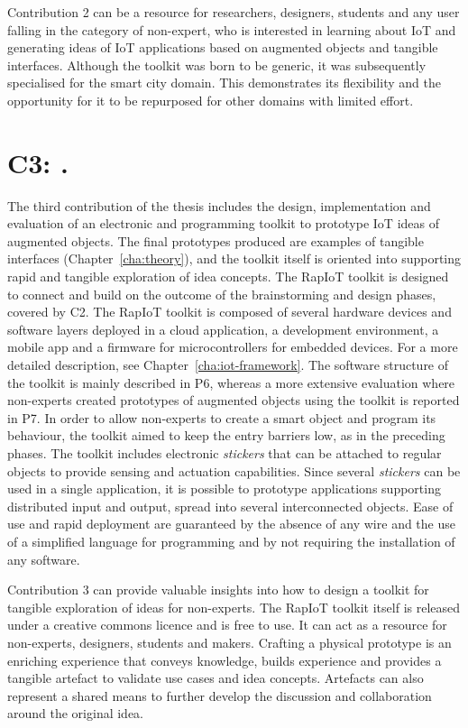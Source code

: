 Contribution 2 can be a resource for researchers, designers, students and any user falling in the category of non-expert, who is interested in learning about IoT and generating ideas of IoT applications based on augmented objects and tangible interfaces. Although the toolkit was born to be generic, it was subsequently specialised for the smart city domain. This demonstrates its flexibility and the opportunity for it to be repurposed for other domains with limited effort.


\section[C3: \Ciii][Contribution 3]{C3: \Ciii.}
\label{c3}

The third contribution of the thesis includes the design, implementation and evaluation of an electronic and programming toolkit to prototype IoT ideas of augmented objects. The final prototypes produced are examples of tangible interfaces (Chapter~\ref{cha:theory}), and the toolkit itself is oriented into supporting rapid and tangible exploration of idea concepts. The RapIoT toolkit is designed to connect and build on the outcome of the brainstorming and design phases, covered by C2.
The RapIoT toolkit is composed of several hardware devices and software layers deployed in a cloud application, a development environment, a mobile app and a firmware for microcontrollers for embedded devices. For a more detailed description, see Chapter~\ref{cha:iot-framework}. The software structure of the toolkit is mainly described in P6, whereas a more extensive evaluation where non-experts created prototypes of augmented objects using the toolkit is reported in P7.
In order to allow non-experts to create a smart object and program its behaviour, the toolkit aimed to keep the entry barriers low, as in the preceding phases.
The toolkit includes electronic \textit{stickers} that can be attached to regular objects to provide sensing and actuation capabilities. Since several \textit{stickers} can be used in a single application, it is possible to prototype applications supporting distributed input and output, spread into several interconnected objects.
Ease of use and rapid deployment are guaranteed by the absence of any wire and the use of a simplified language for programming and by not requiring the installation of any software.

Contribution 3 can provide valuable insights into how to design a toolkit for tangible exploration of ideas for non-experts. The RapIoT toolkit itself is released under a creative commons licence and is free to use. It can act as a resource for non-experts, designers, students and makers. Crafting a physical prototype is an enriching experience that conveys knowledge, builds experience and provides a tangible artefact to validate use cases and idea concepts. Artefacts can also represent a shared means to further develop the discussion and collaboration around the original idea.


